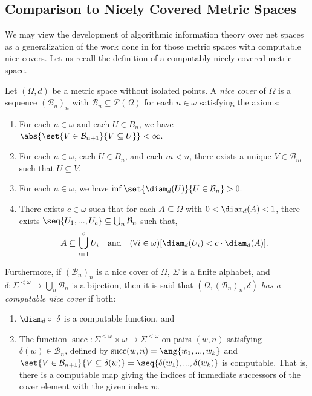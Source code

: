 \subsection{Comparison to Nicely Covered Metric Spaces}

We may view the development of algorithmic information theory over net spaces as a generalization of the work done in \cite{May14} for those metric spaces with computable nice covers. Let us recall the definition of a computably nicely covered metric space. 
\begin{definition}
    Let $(\Omega, d)$ be a metric space without isolated points. A \textit{nice cover} of $\Omega$ is a sequence $(\mathcal{B}_n)_n$ with $\mathcal{B}_n \subseteq \mathcal{P}(\Omega)$ for each $n \in \omega$ satisfying the axioms:
    \begin{enumerate}
        \item[(\textbf{A1})] For each $n \in \omega$ and each $U \in B_n$, we have $\abs{\set{V \in \mathcal{B}_{n + 1}}{V \subseteq U}} < \infty.$
        \item[(\textbf{A2})] For each $n \in \omega$, each $U \in B_n$, and each $m < n$, there exists a unique $V \in \mathcal{B}_m$ such that $U \subseteq V$.
        \item[(\textbf{A3})] For each $n \in \omega$, we have $\inf \set{\diam_d(U)}{U \in \mathcal{B}_n} > 0.$
        \item[(\textbf{A4})] There exists $c \in \omega$ such that for each $A \subseteq \Omega$ with $0 < \diam_d(A) < 1$, there exists $\seq{U_1, ..., U_c} \subseteq \bigcup_n \mathcal{B}_n$ such that,
        \begin{align*}
            A \subseteq \bigcup_{i = 1}^c U_i \quad \text{and} \quad (\forall i \in \omega) [\diam_d(U_i) < c \cdot \diam_d(A)].
        \end{align*}
    \end{enumerate}
    Furthermore, if $(\mathcal{B}_n)_n$ is a nice cover of $\Omega$, $\Sigma$ is a finite alphabet, and $\delta: \Sigma^{<\omega} \to \bigcup_n \mathcal{B}_n$ is a bijection, then it is said that $(\Omega, (\mathcal{B}_n)_n, \delta)$ \textit{has a computable nice cover} if both:
    \begin{enumerate}
        \item[(\textbf{B1})] $\diam_d \circ\ \delta$ is a computable function, and 
        \item[(\textbf{B2})] The function $\operatorname{succ}: \Sigma^{<\omega} \times \omega \to \Sigma^{<\omega}$ on pairs $(w, n)$ satisfying $\delta(w) \in \mathcal{B}_n$, defined by $\operatorname{succ}(w, n) = \ang{w_1, ..., w_k}$ and $\set{V \in \mathcal{B}_{n + 1}}{V \subseteq \delta(w)} = \seq{\delta(w_1), ..., \delta(w_k)}$ is computable. That is, there is a computable map giving the indices of immediate successors of the cover element with the given index $w$.
    \end{enumerate}
    
\end{definition}

